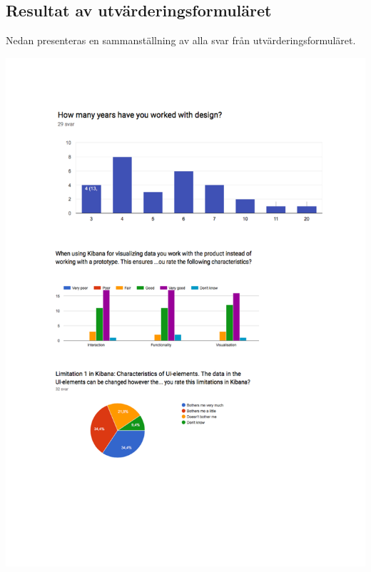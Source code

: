 \documentclass[12pt]{kththesis}
\begin{document}
\begin{appendices}
\section{Resultat av utvärderingsformuläret}
Nedan presenteras en sammanställning av alla svar från utvärderingsformuläret. 

\includegraphics[width=1\textwidth]{UtvarderingSvar1}
\newpage

\end{appendices}
\end{document}
